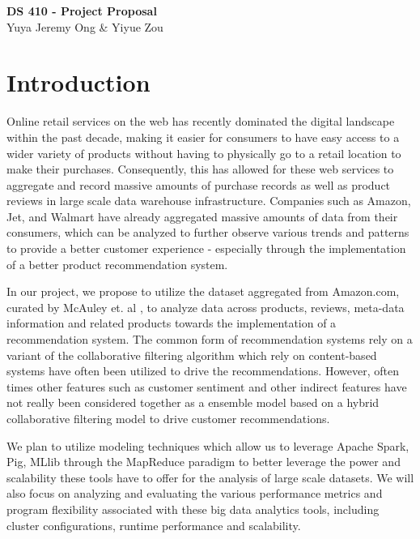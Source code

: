\documentclass[a4paper, 11pt]{article}
\begin{document}
\noindent
\large\textbf{DS 410 - Project Proposal} \\
\normalsize Yuya Jeremy Ong \& Yiyue Zou \\

\section*{Introduction}
Online retail services on the web has recently dominated the digital landscape within the past decade, making it easier for consumers to have easy access to a wider variety of products without having to physically go to a retail location to make their purchases. Consequently, this has allowed for these web services to aggregate and record massive amounts of purchase records as well as product reviews in large scale data warehouse infrastructure. Companies such as Amazon, Jet, and Walmart have already aggregated massive amounts of data from their consumers, which can be analyzed to further observe various trends and patterns to provide a better customer experience - especially through the implementation of a better product recommendation system.

In our project, we propose to utilize the dataset aggregated from Amazon.com, curated by McAuley et. al \cite{McAuley_SIGR15, McAuley_KDD15}, to analyze data across products, reviews, meta-data information and related products towards the implementation of a recommendation system. The common form of recommendation systems rely on a variant of the collaborative filtering algorithm which rely on content-based systems have often been utilized to drive the recommendations. However, often times other features such as customer sentiment and other indirect features have not really been considered together as a ensemble model based on a hybrid collaborative filtering model to drive customer recommendations.

We plan to utilize modeling techniques which allow us to leverage Apache Spark, Pig, MLlib through the MapReduce paradigm to better leverage the power and scalability these tools have to offer for the analysis of large scale datasets. We will also focus on analyzing  and evaluating the various performance metrics and program flexibility associated with these big data analytics tools, including cluster configurations, runtime performance and scalability.
\end{document}
